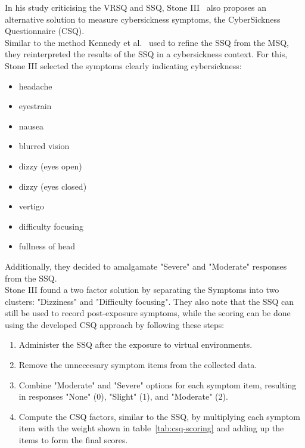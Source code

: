 In his study criticising the VRSQ and SSQ, Stone III~\cite{Stone2017} also proposes an alternative solution to
measure cybersickness symptoms, the CyberSickness Questionnaire (CSQ).
\\
Similar to the method Kennedy et al.\ \cite{Kennedy1993} used to refine the SSQ from the MSQ, they reinterpreted the
results of the SSQ in a cybersickness context.
For this, Stone III selected the symptoms clearly indicating cybersickness:
\begin{itemize}
    \item headache
    \item eyestrain
    \item nausea
    \item blurred vision
    \item dizzy (eyes open)
    \item dizzy (eyes closed)
    \item vertigo
    \item difficulty focusing
    \item fullness of head
\end{itemize}
Additionally, they decided to amalgamate "Severe" and "Moderate" responses from the SSQ\@.
\\
Stone III found a two factor solution by separating the Symptoms into two clusters: "Dizziness" and
"Difficulty focusing".
They also note that the SSQ can still be used to record post-exposure symptoms, while the
scoring can be done using the developed CSQ approach by following these steps:
\begin{enumerate}
    \item Administer the SSQ after the exposure to virtual environments.
    \item Remove the unneccesary symptom items from the collected data.
    \item Combine "Moderate" and "Severe" options for each symptom item, resulting in responses "None" (0), "Slight"
    (1), and "Moderate" (2).
    \item Compute the CSQ factors, similar to the SSQ, by multiplying each symptom item with the weight shown in
    table~\ref{tab:csq-scoring} and adding up the items to form the final scores.
\end{enumerate}
